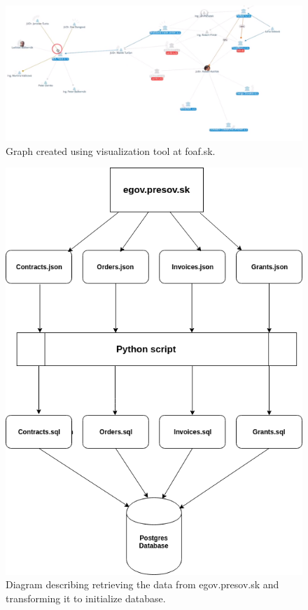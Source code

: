\documentclass[thesis=B,english]{FITthesis}[2012/06/26]
\begin{document}
{\begin{figure}[H]
  \includegraphics[width=\linewidth]{pictures/foafskgraph.png}
  \caption{Graph created using visualization tool at foaf.sk.}
  \label{fig:foafGraph}
\end{figure}

\begin{figure}[H]
  \begin{center}
  \includegraphics[scale=0.6]{pictures/jsonToDb.png}
  \caption{Diagram describing retrieving the data from egov.presov.sk and transforming it to initialize database.}
  \label{fig:jsonToDb}
  \end{center}
\end{figure}

}
\end{document}
